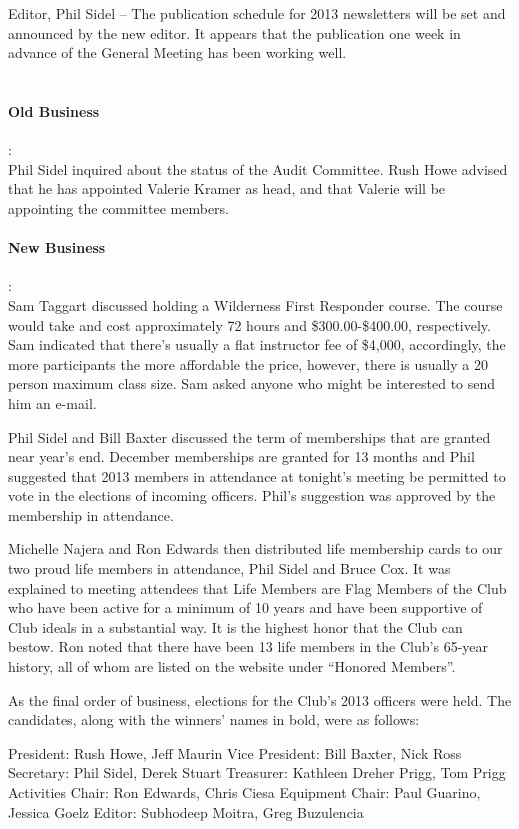 \documentclass[10pt,a4paper]{article}
\begin{document}
\begin{multicols}{2}
Editor, Phil Sidel – The publication schedule for 2013 newsletters will be set and announced by the new editor.  It appears that the publication one week in advance of the General Meeting has been working well.
\\
\\
\paragraph{Old Business} :
\\
Phil Sidel inquired about the status of the Audit Committee.  Rush Howe advised that he has appointed Valerie Kramer as head, and that Valerie will be appointing the committee members.
\\
\paragraph{New Business} :
\\
Sam Taggart discussed holding a Wilderness First Responder course. The course would take and cost approximately 72 hours and \$300.00-\$400.00, respectively. Sam indicated that there's usually a flat instructor fee of \$4,000, accordingly, the more participants the more affordable the price, however, there is usually a 20 person maximum class size.  Sam asked anyone who might be interested to send him an e-mail.

Phil Sidel and Bill Baxter discussed the term of memberships that are granted near year's end. December memberships are granted for 13 months and Phil suggested that 2013 members in attendance at tonight's meeting be permitted to vote in the elections of incoming officers.  Phil's suggestion was approved by the membership in attendance.

Michelle Najera and Ron Edwards then distributed life membership cards to our two proud life members in attendance, Phil Sidel and Bruce Cox.  It was explained to meeting attendees that Life Members are Flag Members of the Club who have been active for a minimum of 10 years and have been supportive of Club ideals in a substantial way.  It is the highest honor that the Club can bestow.  Ron noted that there have been 13 life members in the Club's 65-year history, all of whom are listed on the website under “Honored Members”.

As the final order of business, elections for the Club's 2013 officers were held.  The candidates, along with the winners' names in bold, were as follows:

President:	Rush Howe, Jeff Maurin
Vice President:	Bill Baxter, Nick Ross
Secretary:	Phil Sidel, Derek Stuart
Treasurer:	Kathleen Dreher Prigg, Tom Prigg
Activities Chair:	Ron Edwards, Chris Ciesa
Equipment Chair:	Paul Guarino, Jessica Goelz
Editor:		Subhodeep Moitra, Greg Buzulencia


\end{multicols}
\end{document}
